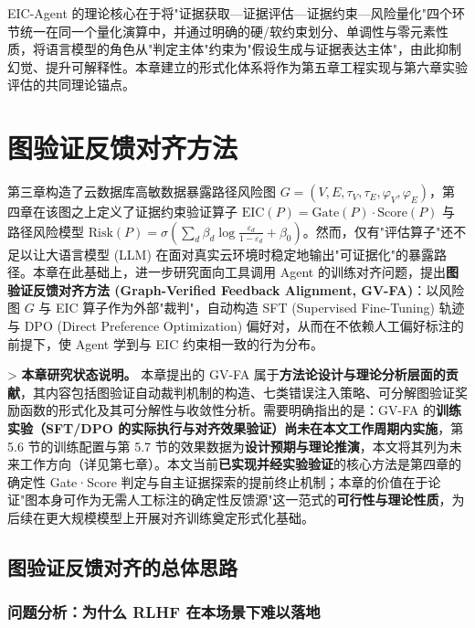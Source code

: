 \documentclass[a4paper,12pt]{ctexart}
\begin{document}
EIC-Agent 的理论核心在于将"证据获取—证据评估—证据约束—风险量化"四个环节统一在同一个量化演算中，并通过明确的硬/软约束划分、单调性与零元素性质，将语言模型的角色从"判定主体"约束为"假设生成与证据表达主体"，由此抑制幻觉、提升可解释性。本章建立的形式化体系将作为第五章工程实现与第六章实验评估的共同理论锚点。



\section{图验证反馈对齐方法}

第三章构造了云数据库高敏数据暴露路径风险图 $G=(V,E,\tau_V,\tau_E,\varphi_V,\varphi_E)$，第四章在该图之上定义了证据约束验证算子 $\mathrm{EIC}(P)=\mathrm{Gate}(P)\cdot \mathrm{Score}(P)$ 与路径风险模型 $\mathrm{Risk}(P)=\sigma\!\left(\sum_{d}\beta_d\log\frac{\varepsilon_d}{1-\varepsilon_d}+\beta_0\right)$。然而，仅有"评估算子"还不足以让大语言模型 (LLM) 在面对真实云环境时稳定地输出"可证据化"的暴露路径。本章在此基础上，进一步研究面向工具调用 Agent 的训练对齐问题，提出\textbf{图验证反馈对齐方法 (Graph-Verified Feedback Alignment, GV-FA)}：以风险图 $G$ 与 EIC 算子作为外部"裁判"，自动构造 SFT (Supervised Fine-Tuning) 轨迹与 DPO (Direct Preference Optimization) 偏好对，从而在不依赖人工偏好标注的前提下，使 Agent 学到与 EIC 约束相一致的行为分布。

\textgreater{} \textbf{本章研究状态说明。} 本章提出的 GV-FA 属于\textbf{方法论设计与理论分析层面的贡献}，其内容包括图验证自动裁判机制的构造、七类错误注入策略、可分解图验证奖励函数的形式化及其可分解性与收敛性分析。需要明确指出的是：GV-FA 的\textbf{训练实验（SFT/DPO 的实际执行与对齐效果验证）尚未在本文工作周期内实施}，第 5.6 节的训练配置与第 5.7 节的效果数据为\textbf{设计预期与理论推演}，本文将其列为未来工作方向（详见第七章）。本文当前\textbf{已实现并经实验验证}的核心方法是第四章的确定性 Gate·Score 判定与自主证据探索的提前终止机制；本章的价值在于论证"图本身可作为无需人工标注的确定性反馈源"这一范式的\textbf{可行性与理论性质}，为后续在更大规模模型上开展对齐训练奠定形式化基础。

\subsection{图验证反馈对齐的总体思路}

\subsubsection{问题分析：为什么 RLHF 在本场景下难以落地}
\end{document}
